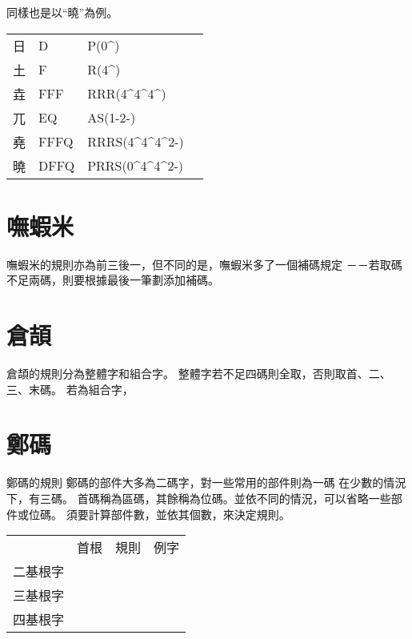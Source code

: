 \documentclass{article}
\def\tac{\textasciicircum}
\begin{document}
同樣也是以``曉''為例。
\begin{tabular}{llll}
日  & D & P(0\tac) \\
土  & F & R(4\tac) \\
垚  & FFF & RRR(4\tac4\tac4\tac) \\
兀  & EQ & AS(1-2-)\\
堯  & FFFQ & RRRS(4\tac4\tac4\tac2-) \\
曉  & DFFQ & PRRS(0\tac4\tac4\tac2-) \\
\end{tabular}

\section{嘸蝦米}
嘸蝦米的規則亦為前三後一，但不同的是，嘸蝦米多了一個補碼規定
－－若取碼不足兩碼，則要根據最後一筆劃添加補碼。
\section{倉頡}
倉頡的規則分為整體字和組合字。
整體字若不足四碼則全取，否則取首、二、三、末碼。
若為組合字，
\section{鄭碼}
鄭碼的規則
鄭碼的部件大多為二碼字，對一些常用的部件則為一碼
在少數的情況下，有三碼。
首碼稱為區碼，其餘稱為位碼。並依不同的情況，可以省略一些部件或位碼。
須要計算部件數，並依其個數，來決定規則。

\begin{tabular}{llll}
           & 首根 & 規則 & 例字\\
  二基根字 & \\
  三基根字 & \\
  四基根字 & \\
\end{tabular}
\end{document}
